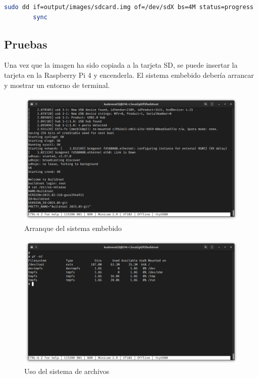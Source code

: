 \documentclass[12pt, letterpaper]{article}
\begin{document}
	\begin{lstlisting}[language=bash]
		sudo dd if=output/images/sdcard.img of=/dev/sdX bs=4M status=progress
		sync
	\end{lstlisting}

	\subsection{Pruebas}

	Una vez que la imagen ha sido copiada a la tarjeta SD, se puede insertar la tarjeta en la Raspberry Pi 4 y encenderla. El sistema embebido debería arrancar y mostrar un entorno de terminal.

	\begin{figure}[H]
		\centering
		\begin{center}
			\includegraphics[width=\textwidth]{img/run-example-01}
			\caption{Arranque del sistema embebido}
			\label{fig:boot}
		\end{center}
	\end{figure}


	\begin{figure}[H]
		\centering
		\begin{center}
			\includegraphics[width=\textwidth]{img/run-example-02}
			\caption{Uso del sistema de archivos}
			\label{fig:boot}
		\end{center}
	\end{figure}
\end{document}
